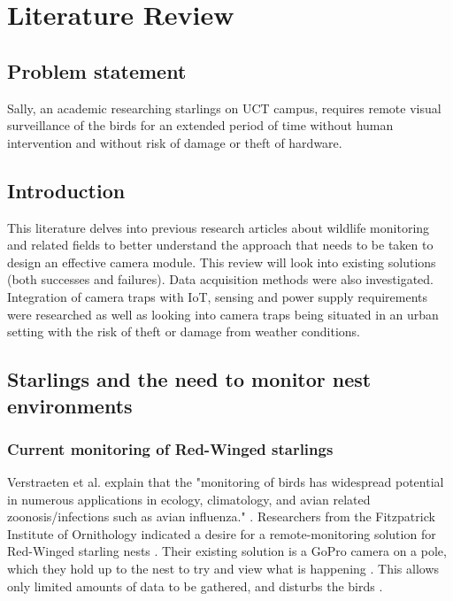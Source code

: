 \documentclass[class=report,11pt,crop=false]{standalone}
\begin{document}
\ifstandalone
\tableofcontents
\fi
\chapter{Literature Review \label{ch:literature}}

\section{Problem statement}

Sally, an academic researching starlings on UCT campus, requires remote visual surveillance of the birds for an extended period of time without human intervention and without risk of damage or theft of hardware.

\section{Introduction}

This literature delves into previous research articles about wildlife monitoring and related fields to better understand the approach that needs to be taken to design an effective camera module. This review will look into existing solutions (both successes and failures). Data acquisition methods were also investigated. Integration of camera traps with IoT, sensing and power supply requirements were researched as well as looking into camera traps being situated in an urban setting with the risk of theft or damage from weather conditions. 


\section{Starlings and the need to monitor nest environments}

\subsection{Current monitoring of Red-Winged starlings}

Verstraeten et al. explain that the "monitoring of birds has widespread potential in numerous applications in ecology, climatology, and avian related zoonosis/infections such as avian influenza." \cite{verstraeten2010webcams}. Researchers from the Fitzpatrick Institute of Ornithology indicated a desire for a remote-monitoring solution for Red-Winged starling nests \cite{hofmeyer2024private}. Their existing solution is a GoPro camera on a pole, which they hold up to the nest to try and view what is happening \cite{hofmeyer2024private}. This allows only limited amounts of data to be gathered, and disturbs the birds \cite{hofmeyer2024private}.
\end{document}
